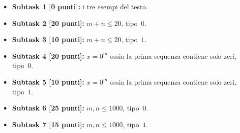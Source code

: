   \begin{itemize}
    \item \textbf{Subtask 1 [0 punti]:} i tre esempi del testo.
    \item \textbf{Subtask 2 [20 punti]:} $m+n \leq 20$, tipo~$0$.
    \item \textbf{Subtask 3 [10 punti]:} $m+n \leq 20$, tipo~$1$.
    \item \textbf{Subtask 4 [20 punti]:} $x=0^m$ ossia la prima sequenza contiene solo zeri, tipo~$0$.
    \item \textbf{Subtask 5 [10 punti]:} $x=0^m$ ossia la prima sequenza contiene solo zeri, tipo~$1$.
    \item \textbf{Subtask 6 [25 punti]:} $m,n \leq 1000$, tipo~$0$.
    \item \textbf{Subtask 7 [15 punti]:} $m,n \leq 1000$, tipo~$1$.      
  \end{itemize}
  
